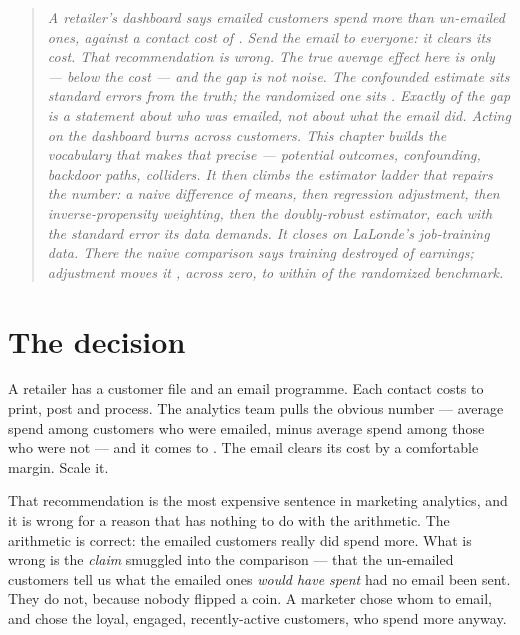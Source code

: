 \begin{quote}\small
\emph{A retailer's dashboard says emailed customers spend \eur{\nbZeroObsNaive} more than
un-emailed ones, against a contact cost of \eur{\nbZeroCost}. Send the email to everyone: it
clears its cost. That recommendation is wrong. The true average effect here is only
\eur{\nbZeroTrueAte} --- below the cost --- and the gap is not noise. The confounded estimate
sits \nbZeroObsSeDist{} standard errors from the truth; the randomized one sits
\nbZeroRandSeDist{}. Exactly \eur{\nbZeroSelBias} of the gap is a statement about \emph{who} was
emailed, not about what the email did. Acting on the dashboard burns \eur{\nbZeroPolBurn} across
\nbZeroNCustomers{} customers. This chapter builds the vocabulary that makes that precise ---
potential outcomes, confounding, backdoor paths, colliders. It then climbs the estimator ladder
that repairs the number: a naive difference of means, then regression adjustment, then
inverse-propensity weighting, then the doubly-robust estimator, each with the standard error its
data demands. It closes on LaLonde's job-training data. There the naive comparison says training
destroyed \usd{\nbZeroLlNaive} of earnings; adjustment moves it \usd{\nbZeroLlSwing}, across
zero, to within \usd{\nbZeroLlShortfall} of the randomized benchmark.}
\end{quote}

\section{The decision}
\label{sec:fnd:decision}

A retailer has a customer file and an email programme. Each contact costs \eur{\nbZeroCost}
to print, post and process. The analytics team pulls the obvious number --- average spend
among customers who were emailed, minus average spend among those who were not --- and it
comes to \eur{\nbZeroObsNaive}. The email clears its cost by a comfortable margin. Scale it.

That recommendation is the most expensive sentence in marketing analytics, and it is wrong
for a reason that has nothing to do with the arithmetic. The arithmetic is correct: the
emailed customers really did spend \eur{\nbZeroObsNaive} more. What is wrong is the
\emph{claim} smuggled into the comparison --- that the un-emailed customers tell us what the
emailed ones \emph{would have spent} had no email been sent. They do not, because nobody
flipped a coin. A marketer chose whom to email, and chose the loyal, engaged, recently-active
customers, who spend more anyway.

